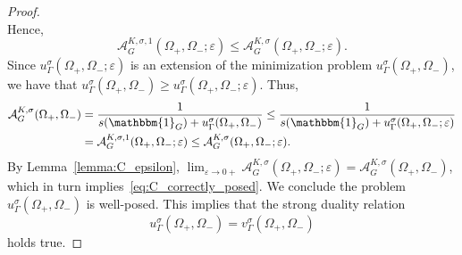 \documentclass[10pt,a4paper]{amsart}
\begin{document}
\begin{proof}
$$$$
Hence,
$$
\mathcal{A}_G^{K,\sigma,1}(\Omega_+, \Omega_-;\varepsilon) \le \mathcal{A}^{K,\sigma}_G(\Omega_+, \Omega_-;\varepsilon).
$$
Since $u_\Gamma^{\sigma}(\Omega_+, \Omega_-;\varepsilon)$ is an extension of the minimization problem $u_\Gamma^\sigma(\Omega_+,\Omega_-)$, we have that $u_\Gamma^{\sigma}(\Omega_+, \Omega_-) \ge u_\Gamma^{\sigma}(\Omega_+, \Omega_-;\varepsilon)$. Thus,
\begin{align*}
\mathcal{A}^{K,\sigma}_G(\Omega_+, \Omega_{-}) & = \frac{1}{s(\mathbbm{1}_G) + u_\Gamma^{\sigma}(\Omega_+, \Omega_-)} 
\le \frac{1}{s(\mathbbm{1}_G) + u_\Gamma^{\sigma}(\Omega_+, \Omega_-;\varepsilon)} \\
& = \mathcal{A}_G^{K,\sigma,1}(\Omega_+, \Omega_-;\varepsilon) \le \mathcal{A}^{K,\sigma}_G(\Omega_+, \Omega_-;\varepsilon).
\end{align*}
By Lemma~\ref{lemma:C_epsilon},
$\lim_{\varepsilon \to 0+} \mathcal{A}^{K,\sigma}_G(\Omega_+, \Omega_-;\varepsilon) = \mathcal{A}^{K,\sigma}_G(\Omega_+, \Omega_{-})$,
which in turn implies~\eqref{eq:C_correctly_posed}. We conclude the problem $u_\Gamma^{\sigma}(\Omega_+, \Omega_-)$ is well-posed. This implies that the strong duality relation
$$
u_\Gamma^{\sigma}(\Omega_+, \Omega_-) = v_\Gamma^{\sigma}(\Omega_+, \Omega_-)
$$
holds true.

\end{proof}
\end{document}
